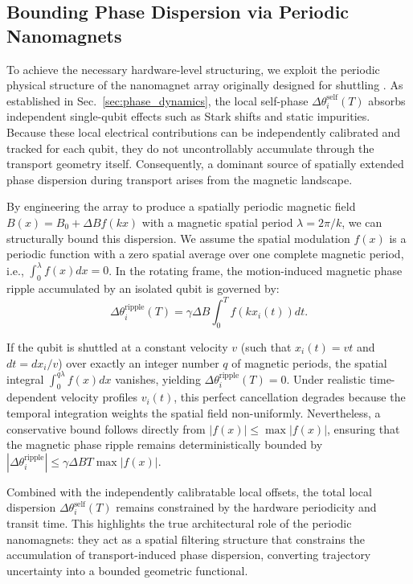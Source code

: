 \documentclass[a4paper,twocolumn,11pt]{quantumarticle}
\begin{document}
\subsection{Bounding Phase Dispersion via Periodic Nanomagnets}
\label{sec:periodic_magnets}

To achieve the necessary hardware-level structuring, we exploit the periodic physical structure of the nanomagnet array originally designed for shuttling \cite{unseld_baseband_2025}. As established in Sec.~\ref{sec:phase_dynamics}, the local self-phase $\Delta\theta_i^{\text{self}}(T)$ absorbs independent single-qubit effects such as Stark shifts and static impurities. Because these local electrical contributions can be independently calibrated and tracked for each qubit, they do not uncontrollably accumulate through the transport geometry itself. Consequently, a dominant source of spatially extended phase dispersion during transport arises from the magnetic landscape.

By engineering the array to produce a spatially periodic magnetic field $B(x) = B_0 + \Delta B f(kx)$ with a magnetic spatial period $\lambda = 2\pi/k$, we can structurally bound this dispersion. We assume the spatial modulation $f(x)$ is a periodic function with a zero spatial average over one complete magnetic period, i.e., $\int_0^\lambda f(x) dx = 0$. In the rotating frame, the motion-induced magnetic phase ripple accumulated by an isolated qubit is governed by:
\begin{equation}
    \Delta\theta_i^{\text{ripple}}(T) = \gamma \Delta B \int_0^T f(k x_i(t)) dt.
    \label{eq:ideal_phase_ripple}
\end{equation}

If the qubit is shuttled at a constant velocity $v$ (such that $x_i(t) = vt$ and $dt = dx_i/v$) over exactly an integer number $q$ of magnetic periods, the spatial integral $\int_0^{q\lambda} f(x) dx$ vanishes, yielding $\Delta\theta_i^{\text{ripple}}(T) = 0$. Under realistic time-dependent velocity profiles $v_i(t)$, this perfect cancellation degrades because the temporal integration weights the spatial field non-uniformly. Nevertheless, a conservative bound follows directly from $|f(x)| \le \max|f(x)|$, ensuring that the magnetic phase ripple remains deterministically bounded by $|\Delta\theta_i^{\text{ripple}}| \le \gamma \Delta B T \max|f(x)|$.

Combined with the independently calibratable local offsets, the total local dispersion $\Delta\theta_i^{\text{self}}(T)$ remains constrained by the hardware periodicity and transit time. This highlights the true architectural role of the periodic nanomagnets: they act as a spatial filtering structure that constrains the accumulation of transport-induced phase dispersion, converting trajectory uncertainty into a bounded geometric functional.
\end{document}
